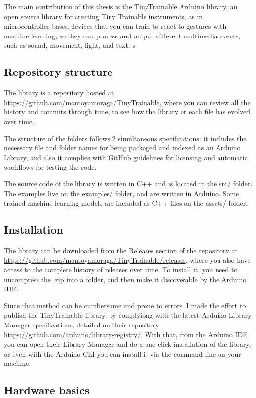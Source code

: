 The main contribution of this thesis is the TinyTrainable Arduino library, an open source library for creating Tiny Trainable instruments, as in microcontroller-based devices that you can train to react to gestures with machine learning, so they can process and output different multimedia events, such as sound, movement, light, and text.
s
\subsection{Repository structure}

The library is a repository hosted at \url{https://github.com/montoyamoraga/TinyTrainable}, where you can review all the history and commits through time, to see how the library or each file has evolved over time.

The structure of the folders follows 2 simultaneous specifications: it includes the necessary file and folder names for being packaged and indexed as an Arduino Library, and also it complies with GitHub guidelines for licensing and automatic workflows for testing the code.

The source code of the library is written in C++ and is located in the src/ folder. The examples live on the examples/ folder, and are written in Arduino. Some trained machine learning models are included as C++ files on the assets/ folder.

\subsection{Installation}

The library can be downloaded from the Releases section of the repository at  \url{https://github.com/montoyamoraga/TinyTrainable/releases}, where you also have access to the complete history of releases over time. To install it, you need to uncompress the .zip into a folder, and then make it discoverable by the Arduino IDE.

Since that method can be cumbersome and prone to errors, I made the effort to publish the TinyTrainable library, by complyiong with the latest Arduino Library Manager specifications, detailed on their repository \url{https://github.com/arduino/library-registry/}. With that, from the Arduino IDE you can open their Library Manager and do a one-click installation of the library, or even with the Arduino CLI you can install it via the command line on your machine.

\subsection{Hardware basics}

